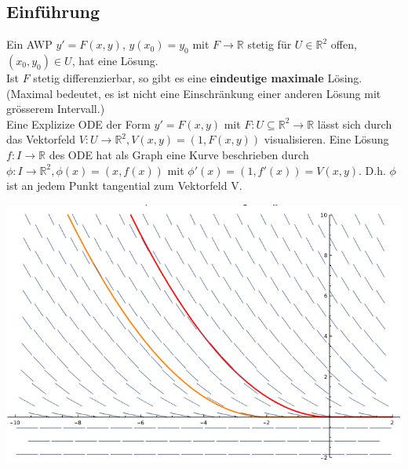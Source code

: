 \subsection{Einführung}
  Ein AWP $y'=F(x,y)$, $y(x_0)=y_0$ mit $F\rightarrow\mathbb R$ stetig für
  $U\in\mathbb R^2$ offen, $(x_0,y_0)\in U$, hat eine Lösung.\\
  Ist $F$ stetig differenzierbar, so gibt es eine \textbf{eindeutige maximale}
  Lösing. (Maximal bedeutet, es ist nicht eine Einschränkung einer anderen Lösung
  mit grösserem Intervall.)\\
  Eine Explizize ODE der Form $y'=F(x,y)$ mit $F: U\subseteq\mathbb 
  R^2\rightarrow\mathbb R$ lässt sich durch das Vektorfeld $V: 
  U\rightarrow\mathbb R^2, V(x,y) = (1, F(x,y))$ visualisieren. Eine Lösung $f: 
  I\rightarrow\mathbb R$ des ODE hat als Graph eine Kurve beschrieben durch
  $\phi:I\rightarrow\mathbb R^2, \phi(x)=(x,f(x))$ mit $\phi'(x)=(1,
  f'(x))=V(x,y)$. D.h. $\phi$ ist an jedem Punkt tangential zum Vektorfeld V.\\
  \begin{minipage}{\linewidth}
    \includegraphics[width=\linewidth]{./sources/beispiel_vektorfelddarstellung.png}
  \end{minipage}
